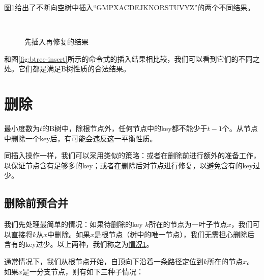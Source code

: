 \documentclass{ctexart}
\begin{document}
图\ref{fig:btree-insert-fp}给出了不断向空树中插入“GMPXACDEJKNORSTUVYZ”的两个不同结果。

\begin{figure}[htbp]
  \centering
   \\
    \caption{先插入再修复的结果} \label{fig:btree-insert-fp}
\end{figure}

和图\ref{fig:btree-insert}所示的命令式的插入结果相比较，我们可以看到它们的不同之处。它们都是满足B树性质的合法结果。


\section{删除}

最小度数为$t$的B树中，除根节点外，任何节点中的key都不能少于$t-1$个。从节点中删除一个key后，有可能会违反这一平衡性质。

同插入操作一样，我们可以采用类似的策略：或者在删除前进行额外的准备工作，以保证节点含有足够多的key；或者在删除后对节点进行修复，以避免含有的key过少。


\subsection{删除前预合并}

我们先处理最简单的情况：如果待删除的key $k$所在的节点为一叶子节点$x$，我们可以直接将$k$从$x$中删除。如果$x$是根节点（树中的唯一节点），我们无需担心删除后含有的key过少。以上两种，我们称之为\underline{情况1}。

通常情况下，我们从根节点开始，自顶向下沿着一条路径定位到$k$所在的节点$x$。如果$x$是一分支节点，则有如下三种子情况：
\end{document}
